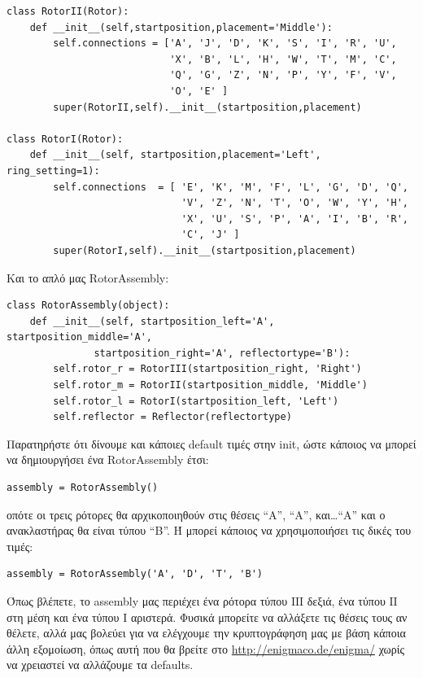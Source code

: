 \documentclass[a4paper,twoside,12pt]{article}
\begin{document}
\small
\begin{verbatim}
class RotorII(Rotor):
    def __init__(self,startposition,placement='Middle'):
        self.connections = ['A', 'J', 'D', 'K', 'S', 'I', 'R', 'U',
                            'X', 'B', 'L', 'H', 'W', 'T', 'M', 'C',
                            'Q', 'G', 'Z', 'N', 'P', 'Y', 'F', 'V',
                            'O', 'E' ]
        super(RotorII,self).__init__(startposition,placement)

class RotorI(Rotor):
    def __init__(self, startposition,placement='Left', ring_setting=1):
        self.connections  = [ 'E', 'K', 'M', 'F', 'L', 'G', 'D', 'Q',
                              'V', 'Z', 'N', 'T', 'O', 'W', 'Y', 'H',
                              'X', 'U', 'S', 'P', 'A', 'I', 'B', 'R',
                              'C', 'J' ]
        super(RotorI,self).__init__(startposition,placement)
\end{verbatim}
\normalsize

Και το απλό μας RotorAssembly:

\small
\begin{verbatim}
class RotorAssembly(object):
    def __init__(self, startposition_left='Α', startposition_middle='Α',
	           startposition_right='Α', reflectortype='B'):
        self.rotor_r = RotorIII(startposition_right, 'Right')
        self.rotor_m = RotorII(startposition_middle, 'Middle')
        self.rotor_l = RotorI(startposition_left, 'Left')
        self.reflector = Reflector(reflectortype)
\end{verbatim}
\normalsize

Παρατηρήστε ότι δίνουμε και κάποιες default τιμές στην init, ώστε κάποιος να μπορεί να δημιουργήσει ένα RotorAssembly  έτσι:

\begin{verbatim}
assembly = RotorAssembly()
\end{verbatim}

οπότε οι τρεις ρότορες θα αρχικοποιηθούν στις θέσεις “Α”, “Α”, και\ldots “Α” και ο ανακλαστήρας θα είναι τύπου “B”. Ή μπορεί κάποιος να χρησιμοποιήσει τις δικές του τιμές:

\begin{verbatim}
assembly = RotorAssembly('A', 'D', 'T', 'B')
\end{verbatim}

Όπως βλέπετε, το assembly μας περιέχει ένα ρότορα τύπου ΙΙΙ δεξιά, ένα τύπου ΙΙ στη μέση και ένα τύπου Ι αριστερά.  Φυσικά μπορείτε να αλλάξετε τις θέσεις τους αν θέλετε, αλλά μας βολεύει για να ελέγχουμε την κρυπτογράφηση μας με βάση κάποια άλλη εξομοίωση, όπως αυτή που θα βρείτε στο \url{http://enigmaco.de/enigma/} χωρίς να χρειαστεί να αλλάζουμε τα defaults.
\end{document}
